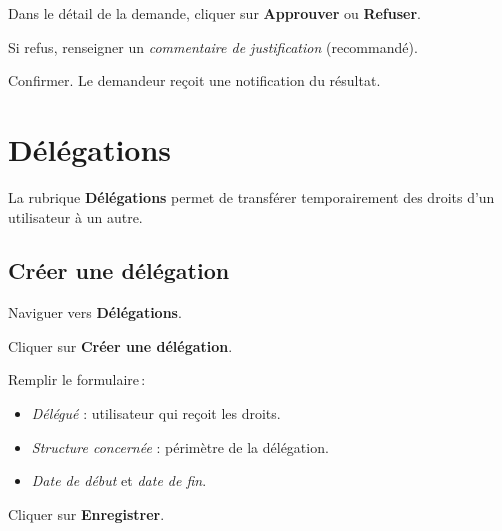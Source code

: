\begin{steps}
  \item Dans le d\'etail de la demande, cliquer sur \textbf{Approuver} ou \textbf{Refuser}.
  \item Si refus, renseigner un \textit{commentaire de justification} (recommand\'e).
  \item Confirmer. Le demandeur re\c{c}oit une notification du r\'esultat.
\end{steps}


\section{D\'el\'egations}

La rubrique \textbf{D\'el\'egations} permet de transf\'erer temporairement des droits d'un utilisateur \`a un autre.


\subsection{Cr\'eer une d\'el\'egation}

\begin{steps}
  \item Naviguer vers \textbf{D\'el\'egations}.
  \item Cliquer sur \textbf{Cr\'eer une d\'el\'egation}.
  \item Remplir le formulaire\,:
    \begin{itemize}
      \item \textit{D\'el\'egu\'e} : utilisateur qui re\c{c}oit les droits.
      \item \textit{Structure concern\'ee} : p\'erim\`etre de la d\'el\'egation.
      \item \textit{Date de d\'ebut} et \textit{date de fin}.
    \end{itemize}
  \item Cliquer sur \textbf{Enregistrer}.
\end{steps}

